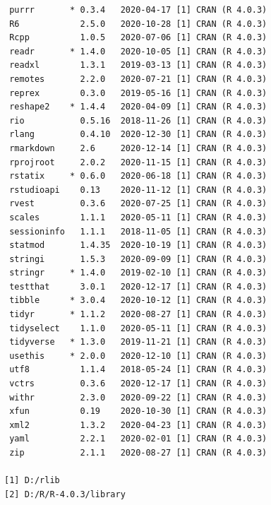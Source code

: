 \documentclass[twoside,12pt,final]{ucthesis-CA2012}
\begin{document}
\begin{ucmainmatter}
\begin{verbatim}
 purrr       * 0.3.4   2020-04-17 [1] CRAN (R 4.0.3)                       
 R6            2.5.0   2020-10-28 [1] CRAN (R 4.0.3)                       
 Rcpp          1.0.5   2020-07-06 [1] CRAN (R 4.0.3)                       
 readr       * 1.4.0   2020-10-05 [1] CRAN (R 4.0.3)                       
 readxl        1.3.1   2019-03-13 [1] CRAN (R 4.0.3)                       
 remotes       2.2.0   2020-07-21 [1] CRAN (R 4.0.3)                       
 reprex        0.3.0   2019-05-16 [1] CRAN (R 4.0.3)                       
 reshape2    * 1.4.4   2020-04-09 [1] CRAN (R 4.0.3)                       
 rio           0.5.16  2018-11-26 [1] CRAN (R 4.0.3)                       
 rlang         0.4.10  2020-12-30 [1] CRAN (R 4.0.3)                       
 rmarkdown     2.6     2020-12-14 [1] CRAN (R 4.0.3)                       
 rprojroot     2.0.2   2020-11-15 [1] CRAN (R 4.0.3)                       
 rstatix     * 0.6.0   2020-06-18 [1] CRAN (R 4.0.3)                       
 rstudioapi    0.13    2020-11-12 [1] CRAN (R 4.0.3)                       
 rvest         0.3.6   2020-07-25 [1] CRAN (R 4.0.3)                       
 scales        1.1.1   2020-05-11 [1] CRAN (R 4.0.3)                       
 sessioninfo   1.1.1   2018-11-05 [1] CRAN (R 4.0.3)                       
 statmod       1.4.35  2020-10-19 [1] CRAN (R 4.0.3)                       
 stringi       1.5.3   2020-09-09 [1] CRAN (R 4.0.3)                       
 stringr     * 1.4.0   2019-02-10 [1] CRAN (R 4.0.3)                       
 testthat      3.0.1   2020-12-17 [1] CRAN (R 4.0.3)                       
 tibble      * 3.0.4   2020-10-12 [1] CRAN (R 4.0.3)                       
 tidyr       * 1.1.2   2020-08-27 [1] CRAN (R 4.0.3)                       
 tidyselect    1.1.0   2020-05-11 [1] CRAN (R 4.0.3)                       
 tidyverse   * 1.3.0   2019-11-21 [1] CRAN (R 4.0.3)                       
 usethis     * 2.0.0   2020-12-10 [1] CRAN (R 4.0.3)                       
 utf8          1.1.4   2018-05-24 [1] CRAN (R 4.0.3)                       
 vctrs         0.3.6   2020-12-17 [1] CRAN (R 4.0.3)                       
 withr         2.3.0   2020-09-22 [1] CRAN (R 4.0.3)                       
 xfun          0.19    2020-10-30 [1] CRAN (R 4.0.3)                       
 xml2          1.3.2   2020-04-23 [1] CRAN (R 4.0.3)                       
 yaml          2.2.1   2020-02-01 [1] CRAN (R 4.0.3)                       
 zip           2.1.1   2020-08-27 [1] CRAN (R 4.0.3)                       

[1] D:/rlib
[2] D:/R/R-4.0.3/library
\end{verbatim}
\backmatter


\end{ucmainmatter}
\end{document}
